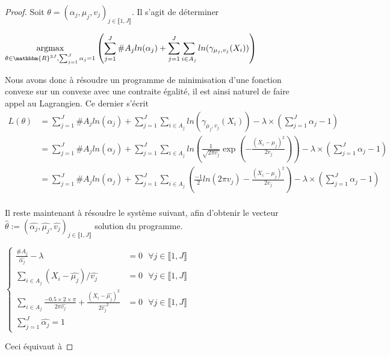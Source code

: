 \documentclass[frenchb]{report}
\newcommand{\R}{\mathbbm{R}}
\newcommand{\1}{\mathbbm{1}}
\theoremstyle{definition}\newtheorem{defn}{Définition}
\theoremstyle{definition}\newtheorem{exm}{Exemple}
\theoremstyle{definition}\newtheorem{nota}{Notation}
\theoremstyle{definition}\newtheorem{rem}{Remarque}
\begin{document}
\begin{proof}
Soit $\theta = (\alpha_j, \mu_j, v_j)_{j \in \llbracket 1,J \rrbracket}$. Il s'agit de déterminer 
\begin{center}
	$\underset{\theta\in\R^{3J}, \sum_{j=1}^J\alpha_j = 1}{\text{argmax}}\left(\displaystyle\sum_{j=1}^J \#A_j ln(\alpha_j)+ \sum_{j=1}^J\sum_{i\in A_j} ln(\gamma_{\mu_j, v_j}(X_i))\right)$
\end{center}
Nous avons donc à résoudre un programme de minimisation d'une fonction convexe sur un convexe avec une contraite égalité, il est ainsi naturel de faire appel au Lagrangien. \newline 
Ce dernier s'écrit
\begin{align*} 
L(\theta) &= \displaystyle\sum_{j=1}^J \#A_j ln(\alpha_j)+ \sum_{j=1}^J\sum_{i\in A_j} ln(\gamma_{\mu_j, v_j}(X_i)) - \lambda\times\left(\sum_{j=1}^J\alpha_j - 1\right)\\
&= \displaystyle\sum_{j=1}^J \#A_j ln(\alpha_j)+ \sum_{j=1}^J\sum_{i\in A_j} ln\left(\frac{1}{\sqrt{2\pi v_j}}\exp\left(-\frac{\left(X_i -\mu_j\right)^2}{2v_j} \right)\right) - \lambda\times\left(\sum_{j=1}^J\alpha_j - 1\right)\\
&= \displaystyle\sum_{j=1}^J \#A_j ln(\alpha_j)+ \sum_{j=1}^J\sum_{i\in A_j}\left( \frac{-1}{2}ln(2\pi v_j) -\frac{(X_i-\mu_j)^2}{2v_j}\right) - \lambda\times\left(\sum_{j=1}^J\alpha_j - 1\right)\\
\end{align*}

Il reste maintenant à résoudre le système suivant, afin d'obtenir le vecteur $\widehat{\theta} := (\widehat{\alpha_j}, \widehat{\mu_j}, \widehat{v_j})_{j\in\llbracket 1,J \rrbracket}$ solution du programme.

$
\begin{cases}
\displaystyle\frac{\#A_j}{\widehat{\alpha_j}} - \lambda &= 0 \text{ } \forall j \in \llbracket 1,J \rrbracket \\
\displaystyle\sum_{i\in A_j} (X_i-\widehat{\mu_j})/\widehat{v_j} & = 0 \text{ } \forall j \in \llbracket 1,J \rrbracket \\
\displaystyle\sum_{i\in A_j} \frac{-0.5 \times 2 \times \pi}{2\pi \widehat{v_j}} +\frac{(X_i-\widehat{\mu_j})^2}{2\widehat{v_j}^2} &= 0 \text{ } \forall j \in \llbracket 1,J \rrbracket\\
\displaystyle\sum_{j=1}^J \widehat{\alpha_j} = 1
\end{cases}
$

Ceci équivaut à 


\end{proof}
\end{document}
